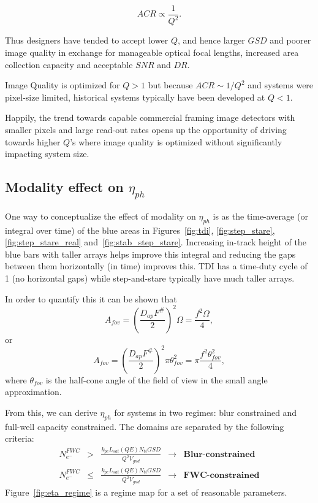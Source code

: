 \documentclass[]{spieman}  %
\begin{document}
\begin{equation}
    ACR \propto \frac{1}{Q^2}.
\end{equation}

Thus designers have tended to accept lower $Q$, and hence larger $GSD$ and poorer image quality in exchange for manageable optical focal lengths, increased area collection capacity and acceptable $SNR$ and $DR$.

\begin{observation}[$Q > 1$]
Image Quality is optimized for $Q>1$ but because $ACR \sim 1/Q^2$ and systems were pixel-size limited, historical systems typically have been developed at $Q<1$.
\end{observation}

Happily, the trend towards capable commercial framing image detectors with smaller pixels and large read-out rates opens up the opportunity of driving towards higher $Q$'s where image quality is optimized without significantly impacting system size.

\subsection{Modality effect on $\eta_{ph}$}
\label{sec:eta_ph}

One way to conceptualize the effect of modality on $\eta_{ph}$ is as the time-average (or integral over time) of the blue areas in Figures~\ref{fig:tdi}, \ref{fig:step_stare}, \ref{fig:step_stare_real} and~\ref{fig:stab_step_stare}.  Increasing in-track height of the blue bars with taller arrays helps improve this integral and reducing the gaps between them horizontally (in time) improves this.  TDI has a time-duty cycle of 1 (no horizontal gaps) while step-and-stare typically have much taller arrays.

In order to quantify this it can be shown that
\begin{equation*}
    A_{fov} = \left(\frac{D_{ap}F^\#}{2}\right)^2 \Omega = \frac{f^2 \Omega}{4} ,
\end{equation*}
or 
\begin{equation}
\label{eq:A_fov}
A_{fov} = \left(\frac{D_{ap}F^\#}{2}\right)^2 \pi \theta_{fov}^2 = \pi \frac{f^2 \theta_{fov}^2}{4},
\end{equation}
where $\theta_{fov}$ is the half-cone angle of the field of view in the small angle approximation.

From this, we can derive $\eta_{ph}$ for systems in two regimes: blur constrained and full-well capacity constrained.  The domains are separated by the following criteria:
\begin{align*}
    N_{e^-}^{FWC} &>& \frac{k_{pe}L_{sat}(QE) N_{bl} GSD}{Q^2 V_{gnd}} & \rightarrow &  \textbf{Blur-constrained} \\
    N_{e^-}^{FWC} &\leq& \frac{k_{pe}L_{sat}(QE) N_{bl} GSD}{Q^2 V_{gnd}} & \rightarrow &  \textbf{FWC-constrained}
\end{align*}
Figure~\ref{fig:eta_regime} is a regime map for a set of reasonable parameters.
\end{document}
